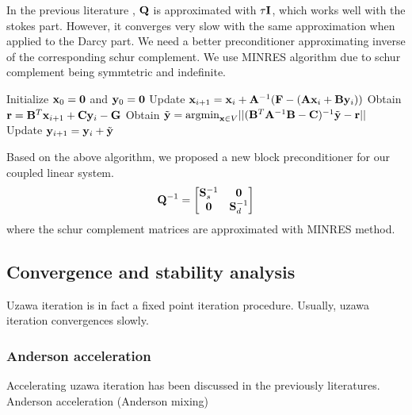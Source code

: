 In the previous literature \cite{AnalysisInexactUzawa_Bramble_Pasciak_Vassilev}, 
$\bold{Q}$ is approximated with $\tau \bold{I}$, which works well with the 
stokes part. However, it converges very slow with the same approximation when 
applied to the Darcy part. We need a better preconditioner approximating 
inverse of the corresponding schur complement.
We use MINRES algorithm \cite{SolSparseIndef_Paige_Saunders} due to schur 
complement being symmtetric and indefinite.

\begin{algorithm}
\caption{Preconditioned Inexact Uzawa Iteration}
		  \begin{algorithmic}[1]
					 \State Initialize $\bold{x}_0 = \bold{0}$ and $\bold{y}_0 = \bold{0}$
					 \State Update $\bold{x}_{i+1} = \bold{x}_i + \bold{A}^{-1} (\bold{F} - (\bold{A}\bold{x}_i + \bold{B}\bold{y}_i))$
					 \State Obtain $\bold{r} = \bold{B}^T\bold{x}_{i+1} + \bold{C}\bold{y}_{i} - \bold{G}$
					 \State Obtain $\tilde{\bold{y}} =\text{argmin}_{\bold{x}\in V} ||(\bold{B}^T\bold{A}^{-1}\bold{B} - \bold{C})^{-1}\tilde{\bold{y}}-\bold{r} ||$
					 \State Update $\bold{y}_{i+1} = \bold{y}_i + \tilde{\bold{y}}$
\end{algorithmic}
\end{algorithm}

Based on the above algorithm, we proposed a new block preconditioner for our
coupled linear system.
\begin{equation}
		  \bold{Q}^{-1} = \begin{bmatrix}
					 \bold{S}_s^{-1} & \bold{0} \\
					 \bold{0} & \bold{S}_d^{-1}
		  \end{bmatrix}
\end{equation}
where the schur complement matrices are approximated with MINRES method.

\subsection{Convergence and stability analysis}
Uzawa iteration is in fact a fixed point iteration procedure.
Usually, uzawa iteration convergences slowly.

\subsubsection{Anderson acceleration}
Accelerating uzawa iteration has been discussed in the previously literatures.
Anderson acceleration (Anderson mixing) \cite{AcceleratingUzawa_ho_Olson_Walker}

